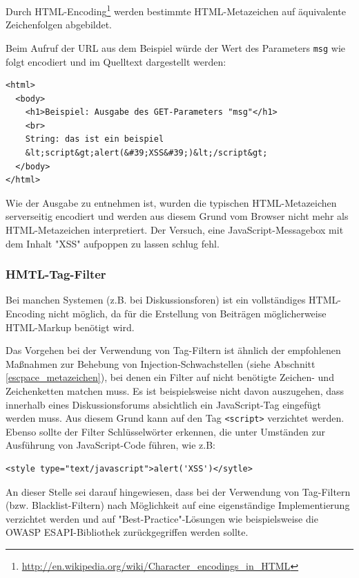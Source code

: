 Durch HTML-Encoding\footnote{\url{http://en.wikipedia.org/wiki/Character\_encodings\_in\_HTML}} 
werden bestimmte HTML-Metazeichen auf äquivalente Zeichenfolgen abgebildet.

Beim Aufruf der URL aus dem Beispiel würde der Wert des Parameters 
\texttt{msg} wie folgt encodiert und im Quelltext dargestellt werden:

\begin{lstlisting}[basicstyle=\ttfamily\footnotesize]
<html>
  <body>
    <h1>Beispiel: Ausgabe des GET-Parameters "msg"</h1>
    <br>
    String: das ist ein beispiel
    &lt;script&gt;alert(&#39;XSS&#39;)&lt;/script&gt;
  </body>
</html>
\end{lstlisting}

Wie der Ausgabe zu entnehmen ist, wurden die typischen HTML-Metazeichen 
serverseitig encodiert und werden aus diesem Grund vom Browser nicht 
mehr als HTML-Metazeichen interpretiert. Der Versuch, eine JavaScript-Messagebox 
mit dem Inhalt "XSS" aufpoppen zu lassen schlug fehl.

\subsubsection{HMTL-Tag-Filter}

Bei manchen Systemen (z.B. bei Diskussionsforen) ist ein vollständiges 
HTML-Encoding nicht möglich, da für die Erstellung von Beiträgen 
möglicherweise HTML-Markup benötigt wird. 

Das Vorgehen bei der Verwendung von Tag-Filtern ist ähnlich der 
empfohlenen Maßnahmen zur Behebung von Injection-Schwachstellen 
(siehe Abschnitt \ref{escpace_metazeichen}), bei denen ein Filter auf 
nicht benötigte Zeichen- und Zeichenketten matchen muss. Es ist 
beispielsweise nicht davon auszugehen, dass innerhalb eines 
Diskussionsforums absichtlich ein JavaScript-Tag eingefügt werden 
muss. Aus diesem Grund kann auf den Tag \texttt{<script>} verzichtet 
werden. Ebenso sollte der Filter Schlüsselwörter erkennen, die unter 
Umständen zur Ausführung von JavaScript-Code führen, wie z.B:

\begin{lstlisting}[basicstyle=\ttfamily\footnotesize]
<style type="text/javascript">alert('XSS')</sytle>
\end{lstlisting}

An dieser Stelle sei darauf hingewiesen, dass bei der Verwendung von 
Tag-Filtern (bzw. Blacklist-Filtern) nach Möglichkeit auf eine 
eigenständige Implementierung verzichtet werden und auf 
"Best-Practice"-Lösungen wie beispielsweise die OWASP 
ESAPI-Bibliothek zurückgegriffen werden sollte.

